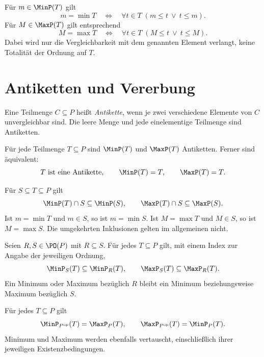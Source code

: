 \begin{theorem}
\label{b12guide:thm:extremal-comparable}
Für $m\in\MinP(T)$ gilt
\[
 m=\min T\quad\Longleftrightarrow\quad
       \forall t\in T\;(m\leq t\ \lor\ t\leq m).
\]
Für $M\in\MaxP(T)$ gilt entsprechend
\[
 M=\max T\quad\Longleftrightarrow\quad
       \forall t\in T\;(M\leq t\ \lor\ t\leq M).
\]
Dabei wird nur die Vergleichbarkeit mit dem genannten Element
verlangt, keine Totalität der Ordnung auf $T$.
\end{theorem}

\section{Antiketten und Vererbung}

\begin{definition}[Antikette]\label{b12guide:def:antichain}
Eine Teilmenge $C\subseteq P$ heißt \emph{Antikette}, wenn
je zwei verschiedene Elemente von $C$ unvergleichbar sind.
Die leere Menge und jede einelementige Teilmenge sind Antiketten.
\end{definition}

\begin{theorem}
\label{b12guide:thm:extremal-antichains}
Für jede Teilmenge $T\subseteq P$ sind $\MinP(T)$ und $\MaxP(T)$
Antiketten. Ferner sind äquivalent:
\[
 T\text{ ist eine Antikette},\qquad
 \MinP(T)=T,\qquad \MaxP(T)=T.
\]
\end{theorem}

\begin{theorem}
\label{b12guide:thm:extremal-subsets}
Für $S\subseteq T\subseteq P$ gilt
\[
 \MinP(T)\cap S\subseteq\MinP(S),\qquad
 \MaxP(T)\cap S\subseteq\MaxP(S).
\]
Ist $m=\min T$ und $m\in S$, so ist $m=\min S$.
Ist $M=\max T$ und $M\in S$, so ist $M=\max S$.
Die umgekehrten Inklusionen gelten im allgemeinen nicht.
\end{theorem}

\begin{theorem}
\label{b12guide:thm:extremal-refinement}
Seien $R,S\in\PO(P)$ mit $R\subseteq S$. Für jedes $T\subseteq P$
gilt, mit einem Index zur Angabe der jeweiligen Ordnung,
\[
 \MinP_S(T)\subseteq\MinP_R(T),\qquad
 \MaxP_S(T)\subseteq\MaxP_R(T).
\]
Ein Minimum oder Maximum bezüglich $R$ bleibt ein Minimum
beziehungsweise Maximum bezüglich $S$.
\end{theorem}

\begin{theorem}
Für jedes $T\subseteq P$ gilt
\[
 \MinP_{P^{\mathrm{op}}}(T)=\MaxP_P(T),\qquad
 \MaxP_{P^{\mathrm{op}}}(T)=\MinP_P(T).
\]
Minimum und Maximum werden ebenfalls vertauscht, einschließlich
ihrer jeweiligen Existenzbedingungen.
\end{theorem}
